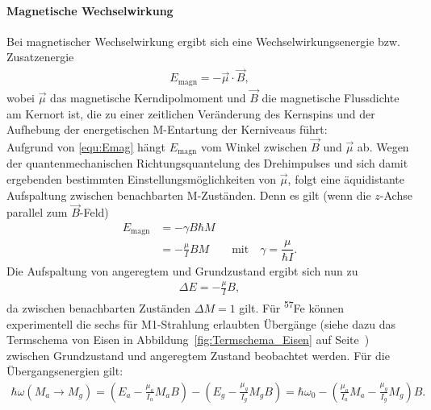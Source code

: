 \documentclass[a4paper,twoside,final]{article}
\begin{document}
\paragraph{Magnetische Wechselwirkung}
Bei magnetischer Wechselwirkung ergibt sich eine Wechselwirkungsenergie bzw. Zusatzenergie
\begin{align}\label{equ:Emag}
E_\text{magn} = - \vec{\mu}\cdot\vec{B},
\end{align}
wobei $\vec{\mu}$ das magnetische Kerndipolmoment und $\vec{B}$ die magnetische Flussdichte am Kernort ist, die zu einer zeitlichen Veränderung des Kernspins und  der Aufhebung der energetischen M-Entartung der Kerniveaus führt:\\
Aufgrund von \eqref{equ:Emag} hängt $E_\text{magn}$ vom Winkel zwischen $\vec{B}$ und $\vec{\mu}$ ab. Wegen der quantenmechanischen Richtungsquantelung des Drehimpulses und sich damit ergebenden bestimmten Einstellungsmöglichkeiten von $\vec{\mu}$, folgt eine äquidistante Aufspaltung zwischen benachbarten M-Zuständen. Denn es gilt (wenn die $z$-Achse parallel zum $\vec{B}$-Feld)
\begin{align}
E_\text{magn} &= -\gamma B \hbar M\\
              &= - \frac{\mu}{I} B M \qquad \text{mit} \quad \gamma = \dfrac{\mu}{\hbar I}.
\end{align}
Die Aufspaltung von angeregtem und Grundzustand ergibt sich nun zu
\begin{align}\label{eqn:Magnetfeld}
  \Delta E = - \frac{\mu}{I} B,
\end{align}
da zwischen benachbarten Zuständen $\Delta M = 1$ gilt.
Für \textsuperscript{57}Fe können experimentell die sechs für M1-Strahlung erlaubten Übergänge (siehe dazu das Termschema von Eisen in Abbildung~\ref{fig:Termschema_Eisen} auf Seite~\pageref{fig:Termschema_Eisen}) zwischen Grundzustand und angeregtem Zustand beobachtet werden. Für die Übergangsenergien gilt:
\begin{align}
\hbar\omega (M_a \rightarrow M_g) = \left(E_a - \frac{\mu_a} {I_a} M_a B \right) - \left(E_g - \frac{\mu_g} {I_g} M_g B \right)  = \hbar\omega_0 - \left(\frac{\mu_a }{I_a} M_a - \frac{\mu_g}{I_g} M_g\right) B.
\end{align}
\end{document}
